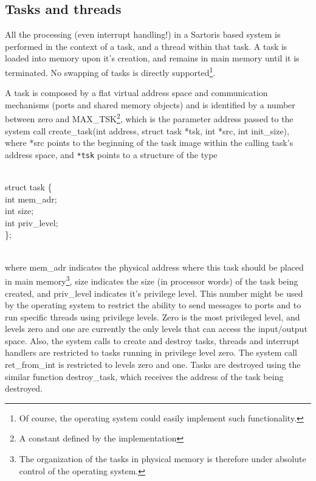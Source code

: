 \documentclass[12pt, letterpaper, oneside, english]{article}
\begin{document}
\subsection{Tasks and threads}
All the processing (even interrupt handling!) in a Sartoris based system is performed in the context of a task, and a thread within that task. A task is loaded into memory upon it's creation, and remains in main memory until it is terminated. No swapping of tasks is directly supported\footnote{Of course, the operating system could easily implement such functionality.}.

A task is composed by a flat virtual address space and communication mechanisms (ports and shared memory objects) and is identified by a number between zero and \textsf{MAX\_TSK}\footnote{A constant defined by the implementation}, which is the parameter \textsf{address} passed to the system call \textsf{create\_task(int address, struct task *tsk, int *src, int init\_size)}, where \textsf{*src} points to the beginning of the task image within the calling task's address space, and \verb|*tsk| points to a structure of the type \\
\\
\begin{sf} \noindent struct task \{ \\
\indent  int mem\_adr; \\
\indent  int size; \\
\indent  int priv\_level; \\
\}; \\
\end{sf}
\\
\noindent where \textsf{mem\_adr} indicates the physical address where this task should be placed in main memory\footnote{The organization of the tasks in physical memory is therefore under absolute control of the operating system.}, \textsf{size} indicates the size (in processor words) of the task being created, and \textsf{priv\_level} indicates it's privilege level. This number might be used by the operating system to restrict the ability to send messages to ports and to run specific threads using privilege levels. Zero is the most privileged level, and levels zero and one are currently the only levels that can access the input$/$output space. Also, the system calls to create and destroy tasks, threads and interrupt handlers are restricted to tasks running in privilege level zero. The system call \textsf{ret\_from\_int} is restricted to levels zero and one.
Tasks are destroyed using the similar function \textsf{destroy\_task}, which receives the address of the task being destroyed.
\end{document}

